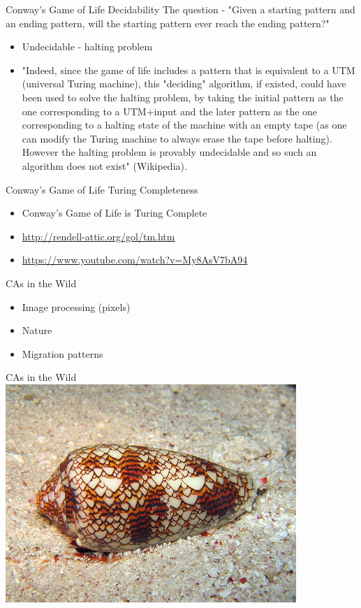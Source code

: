 \documentclass[bigger]{beamer}
\begin{document}
\begin{frame}[label=sec-21]{Conway's Game of Life Decidability}
The question - "Given a starting pattern and an ending pattern, will the starting pattern ever reach the ending pattern?"
\begin{itemize}
\item<2->Undecidable - halting problem
\item<3->"Indeed, since the game of life includes a pattern that is equivalent to a UTM (universal Turing machine), this "deciding" algorithm, if existed, could have been used to solve the halting problem, by taking the initial pattern as the one corresponding to a UTM+input and the later pattern as the one corresponding to a halting state of the machine with an empty tape (as one can modify the Turing machine to always erase the tape before halting). However the halting problem is provably undecidable and so such an algorithm does not exist" (Wikipedia).
\end{itemize}
\end{frame}
\begin{frame}[label=sec-22]{Conway's Game of Life Turing Completeness}
\begin{itemize}
\item Conway's Game of Life is Turing Complete
\item \url{http://rendell-attic.org/gol/tm.htm}
\item \url{https://www.youtube.com/watch?v=My8AsV7bA94}
\end{itemize}
\end{frame}
\begin{frame}[label=sec-23]{CAs in the Wild}
\begin{itemize}
\item<1->Image processing (pixels)
\item<2->Nature
\item<3->Migration patterns
\end{itemize}
\end{frame}
\begin{frame}[label=sec-24]{CAs in the Wild}
\includegraphics[width=11cm]{images/shell.jpg}
\end{frame}
\end{document}
